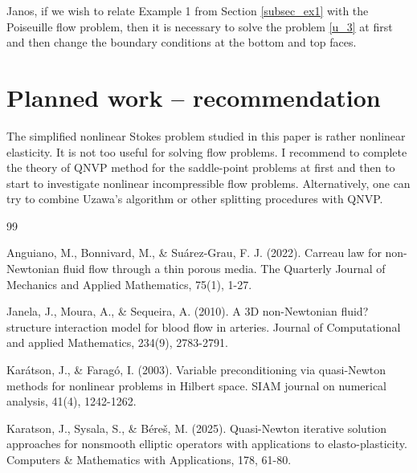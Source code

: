 \documentclass[12pt]{article}
\numberwithin{equation}{section}
\begin{document}
\alert{Janos, if we wish to relate Example 1 from Section \ref{subsec_ex1} with the Poiseuille flow problem, then it is necessary to solve the problem \eqref{u_3} at first and then change the boundary conditions at the bottom and top faces.}



\section{Planned work -- recommendation}

\alert{The simplified nonlinear Stokes problem studied in this paper is rather nonlinear elasticity. It is not too useful for solving flow problems. I recommend to complete the theory of QNVP method for the saddle-point problems at first and then to start to investigate nonlinear incompressible flow problems. Alternatively, one can try to combine Uzawa's algorithm or other splitting procedures with QNVP.}


	
\begin{thebibliography}{99}
	
Anguiano, M., Bonnivard, M., \& Suárez-Grau, F. J. (2022). Carreau law for non-Newtonian fluid flow through a thin porous media. The Quarterly Journal of Mechanics and Applied Mathematics, 75(1), 1-27.

Janela, J., Moura, A., \& Sequeira, A. (2010). A 3D non-Newtonian fluid?structure interaction model for blood flow in arteries. Journal of Computational and applied Mathematics, 234(9), 2783-2791.
			
Karátson, J., \& Faragó, I. (2003). Variable preconditioning via quasi-Newton methods for nonlinear problems in Hilbert space. SIAM journal on numerical analysis, 41(4), 1242-1262.

Karatson, J., Sysala, S., \& Béreš, M. (2025). Quasi-Newton iterative solution approaches for nonsmooth elliptic operators with applications to elasto-plasticity. Computers \& Mathematics with Applications, 178, 61-80.
					

\end{thebibliography}
		
		
\end{document}
